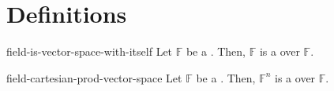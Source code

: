 \documentclass[preview]{standalone}
\begin{document}
\genpage

\section{Definitions}


\begin{snippetproposition}{field-is-vector-space-with-itself}{}
    Let \(\mathbb{F}\) be a \field. Then, \(\mathbb{F}\) is a
    \vectorspace over \(\mathbb{F}\).
\end{snippetproposition}

\begin{snippetproposition}{field-cartesian-prod-vector-space}{}
    Let \(\mathbb{F}\) be a \field. Then, \({\mathbb{F}}^n\) is a
    \vectorspace over \(\mathbb{F}\).
\end{snippetproposition}





\end{document}
